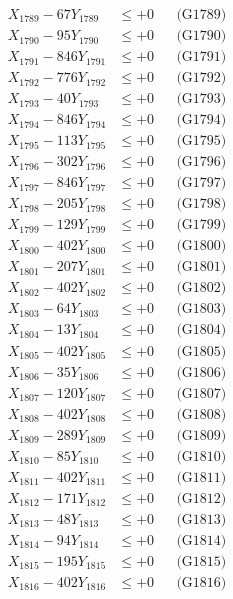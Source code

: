 \documentclass[a4paper,10pt]{article}
\begin{document}
{\begin{align}
X_{1789} - 67Y_{1789} &\leq +0 && \text{(G1789)} \\
X_{1790} - 95Y_{1790} &\leq +0 && \text{(G1790)} \\
\allowbreak
X_{1791} - 846Y_{1791} &\leq +0 && \text{(G1791)} \\
X_{1792} - 776Y_{1792} &\leq +0 && \text{(G1792)} \\
X_{1793} - 40Y_{1793} &\leq +0 && \text{(G1793)} \\
X_{1794} - 846Y_{1794} &\leq +0 && \text{(G1794)} \\
X_{1795} - 113Y_{1795} &\leq +0 && \text{(G1795)} \\
X_{1796} - 302Y_{1796} &\leq +0 && \text{(G1796)} \\
X_{1797} - 846Y_{1797} &\leq +0 && \text{(G1797)} \\
X_{1798} - 205Y_{1798} &\leq +0 && \text{(G1798)} \\
X_{1799} - 129Y_{1799} &\leq +0 && \text{(G1799)} \\
X_{1800} - 402Y_{1800} &\leq +0 && \text{(G1800)} \\
\allowbreak
X_{1801} - 207Y_{1801} &\leq +0 && \text{(G1801)} \\
X_{1802} - 402Y_{1802} &\leq +0 && \text{(G1802)} \\
X_{1803} - 64Y_{1803} &\leq +0 && \text{(G1803)} \\
X_{1804} - 13Y_{1804} &\leq +0 && \text{(G1804)} \\
X_{1805} - 402Y_{1805} &\leq +0 && \text{(G1805)} \\
X_{1806} - 35Y_{1806} &\leq +0 && \text{(G1806)} \\
X_{1807} - 120Y_{1807} &\leq +0 && \text{(G1807)} \\
X_{1808} - 402Y_{1808} &\leq +0 && \text{(G1808)} \\
X_{1809} - 289Y_{1809} &\leq +0 && \text{(G1809)} \\
X_{1810} - 85Y_{1810} &\leq +0 && \text{(G1810)} \\
\allowbreak
X_{1811} - 402Y_{1811} &\leq +0 && \text{(G1811)} \\
X_{1812} - 171Y_{1812} &\leq +0 && \text{(G1812)} \\
X_{1813} - 48Y_{1813} &\leq +0 && \text{(G1813)} \\
X_{1814} - 94Y_{1814} &\leq +0 && \text{(G1814)} \\
X_{1815} - 195Y_{1815} &\leq +0 && \text{(G1815)} \\
X_{1816} - 402Y_{1816} &\leq +0 && \text{(G1816)} \\

\end{align}}
\end{document}
